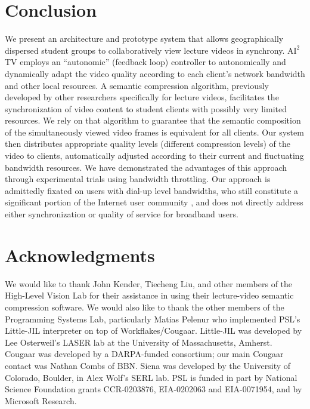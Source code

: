 \documentclass{sig-alternate}
\begin{document}
\section{Conclusion}

We present an architecture and prototype system that allows
geographically dispersed student groups to collaboratively view
lecture videos in synchrony. $\mathrm{AI}^2$TV employs an
``autonomic'' (feedback loop) controller to autonomically and
dynamically adapt the video quality according to each client's network
bandwidth and other local resources.  A semantic compression
algorithm, previously developed by other researchers specifically for
lecture videos, facilitates the synchronization of video content to
student clients with possibly very limited resources.  We rely on that
algorithm to guarantee that the semantic composition of the
simultaneously viewed video frames is equivalent for all clients.  Our
system then distributes appropriate quality levels (different
compression levels) of the video to clients, automatically adjusted
according to their current and fluctuating bandwidth resources.  We
have demonstrated the advantages of this approach through experimental
trials using bandwidth throttling.  Our approach is admittedly fixated
on users with dial-up level bandwidths, who still constitute a
significant portion of the Internet user community \cite{DIALUP}, and
does not directly address either synchronization or quality of service
for broadband users.

\section{Acknowledgments}

We would like to thank John Kender, Tiecheng Liu, and other members of
the High-Level Vision Lab for their assistance in using their
lecture-video semantic compression software.  We would also like to
thank the other members of the Programming Systems Lab, particularly
Matias Pelenur who implemented PSL's Little-JIL interpreter on top of
Workflakes/Cougaar.  Little-JIL was developed by Lee Osterweil's LASER
lab at the University of Massachusetts, Amherst. Cougaar was developed
by a DARPA-funded consortium; our main Cougaar contact was Nathan
Combs of BBN.  Siena was developed by the University of Colorado,
Boulder, in Alex Wolf's SERL lab. PSL is funded in part by National
Science Foundation grants CCR-0203876, EIA-0202063 and EIA-0071954,
and by Microsoft Research.
\end{document}
